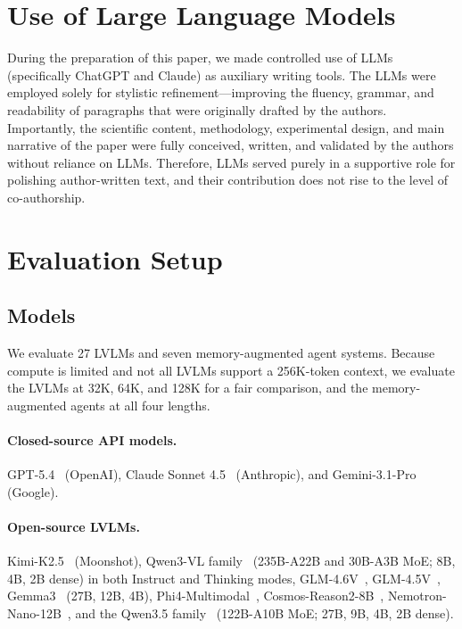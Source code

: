 \documentclass{article}
\begin{document}
\newpage
\appendix


\section{Use of Large Language Models}
\label{app:llm_use}

During the preparation of this paper, we made controlled use of LLMs (specifically ChatGPT and Claude) as auxiliary writing tools. The LLMs were employed solely for stylistic refinement---improving the fluency, grammar, and readability of paragraphs that were originally drafted by the authors. Importantly, the scientific content, methodology, experimental design, and main narrative of the paper were fully conceived, written, and validated by the authors without reliance on LLMs. Therefore, LLMs served purely in a supportive role for polishing author-written text, and their contribution does not rise to the level of co-authorship.
\vspace{-3mm}

\section{Evaluation Setup}
\label{app:eval_setup}

\subsection{Models}
\label{subsec:models}

We evaluate 27 LVLMs and seven memory-augmented agent systems. Because compute is limited and not all LVLMs support a 256K-token context, we evaluate the LVLMs at 32K, 64K, and 128K for a fair comparison, and the memory-augmented agents at all four lengths.

\paragraph{Closed-source API models.}
GPT-5.4~\citep{singh2025openaigpt5card} (OpenAI), Claude Sonnet 4.5~\citep{anthropic2025claudesonnet45card} (Anthropic), and Gemini-3.1-Pro~\citep{googledeepmind2026gemini31pro} (Google).

\paragraph{Open-source LVLMs.}
Kimi-K2.5~\citep{kimiteam2026kimik25visualagentic} (Moonshot), 
Qwen3-VL family~\citep{bai2025qwen3vltechnicalreport} (235B-A22B and 30B-A3B MoE; 8B, 4B, 2B dense) in both Instruct and Thinking modes, GLM-4.6V~\citep{zai2025glm46vcard}, GLM-4.5V~\citep{vteam2026glm45vglm41vthinkingversatilemultimodal}, Gemma3~\citep{gemmateam2025gemma3technicalreport} (27B, 12B, 4B), Phi4-Multimodal~\citep{microsoft2025phi4minitechnicalreportcompact}, Cosmos-Reason2-8B~\citep{nvidia2025cosmosreason2card}, Nemotron-Nano-12B~\citep{nvidia2025nvidianemotronnanov2}, and the Qwen3.5 family~\citep{qwenteam2026qwen35nativemultimodalagents} (122B-A10B MoE; 27B, 9B, 4B, 2B dense).
\end{document}
